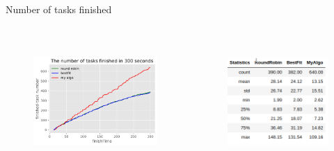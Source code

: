 \documentclass[10pt,xcolor={dvipsnames}, aspectratio=169]{beamer}
\begin{document}
\begin{frame}
{Number of tasks finished}
	\begin{columns}
		\begin{column}{0.48\textwidth}
			\begin{figure}
				\centering
				\includegraphics[scale=0.6, height=5cm]{images/tasks_accumulation.png}
			\end{figure}
		\end{column}

		\hfill		
		
		\begin{column}{0.48\textwidth}
			\begin{figure}
				\centering
				\includegraphics[scale=0.7, height=5cm]{images/running_statistics.png}
			\end{figure}		
		\end{column}
	\end{columns}
\end{frame}
\end{document}
